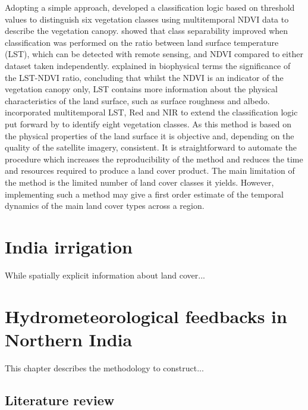 \documentclass{icldt}\usepackage[]{graphicx}\usepackage[]{color}
\begin{document}
Adopting a simple approach, \citet{Running1995} developed a classification logic based on threshold values to distinguish six vegetation classes using multitemporal NDVI data to describe the vegetation canopy. \citet{Lambin1995} showed that class separability improved when classification was performed on the ratio between land surface temperature (LST), which can be detected with remote sensing, and NDVI compared to either dataset taken independently. \citet{Lambin1996} explained in biophysical terms the significance of the LST-NDVI ratio, concluding that whilst the NDVI is an indicator of the vegetation canopy only, LST contains more information about the physical characteristics of the land surface, such as surface roughness and albedo. \citet{Nemani1997} incorporated multitemporal LST, Red and NIR to extend the classification logic put forward by \citet{Running1995} to identify eight vegetation classes. As this method is based on the physical properties of the land surface it is objective and, depending on the quality of the satellite imagery, consistent. It is straightforward to automate the procedure which increases the reproducibility of the method and reduces the time and resources required to produce a land cover product. The main limitation of the method is the limited number of land cover classes it yields. However, implementing such a method may give a first order estimate of the temporal dynamics of the main land cover types across a region. \\




\chapter{India irrigation}

While spatially explicit information about land cover... \\





\chapter{Hydrometeorological feedbacks in Northern India}

This chapter describes the methodology to construct... \\

\newpage
\section{Literature review}
\end{document}
